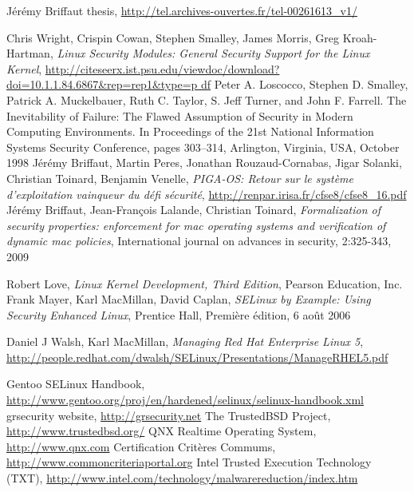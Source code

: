 \documentclass[pdftex,a4paper,titlepage,11pt]{article}
\begin{document}

\newpage


\begin{thebibliography}{40}

 Jérémy Briffaut thesis,
\url{http://tel.archives-ouvertes.fr/tel-00261613_v1/}

 Chris Wright, Crispin Cowan, Stephen Smalley, James Morris,
Greg Kroah-Hartman, \textit{Linux Security Modules: General Security Support for
the Linux Kernel},
\url{
http://citeseerx.ist.psu.edu/viewdoc/download?doi=10.1.1.84.6867&rep=rep1&type=p
df}
 Peter A. Loscocco, Stephen D. Smalley, Patrick A. Muckelbauer,
Ruth C. Taylor, S. Jeff Turner, and John F. Farrell. The Inevitability of
Failure: The Flawed Assumption of Security in Modern Computing Environments. In
Proceedings of the 21st National Information Systems Security Conference, pages
303–314, Arlington, Virginia, USA, October 1998
 Jérémy Briffaut, Martin Peres, Jonathan
Rouzaud-Cornabas, Jigar Solanki, Christian Toinard, Benjamin Venelle,
\textit{PIGA-OS: Retour sur le système d'exploitation vainqueur du défi
sécurité}, \url{http://renpar.irisa.fr/cfse8/cfse8_16.pdf}
 Jérémy Briffaut, Jean-François Lalande, Christian Toinard,
\textit{Formalization of security properties: enforcement for mac operating
systems and verification of dynamic mac policies}, International journal on
advances in security, 2:325-343, 2009

 Robert Love, \textit{Linux Kernel Development, Third Edition},
Pearson Education, Inc.
 Frank Mayer, Karl MacMillan, David Caplan,
\textit{SELinux by Example: Using Security Enhanced Linux}, Prentice Hall,
Première édition, 6 août 2006

 Daniel J Walsh, Karl MacMillan, \textit{Managing Red Hat
Enterprise Linux 5},
\url{http://people.redhat.com/dwalsh/SELinux/Presentations/ManageRHEL5.pdf}

 Gentoo SELinux Handbook,
\url{http://www.gentoo.org/proj/en/hardened/selinux/selinux-handbook.xml}
 grsecurity website, \url{http://grsecurity.net}
 The TrustedBSD Project, \url{http://www.trustedbsd.org/}
 QNX Realtime Operating System, \url{http://www.qnx.com}
 Certification Critères Commums,
\url{http://www.commoncriteriaportal.org}
 Intel Trusted Execution Technology (TXT),
\url{http://www.intel.com/technology/malwarereduction/index.htm}


\end{thebibliography}
\end{document}
